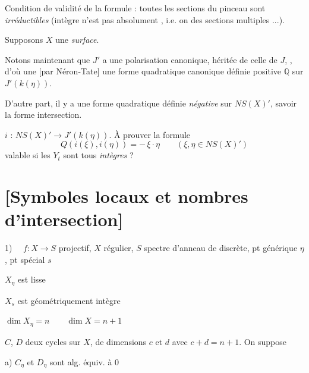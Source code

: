 \documentclass[11pt,a4paper]{article}
\begin{document}
Condition de validité de la formule : toutes les sections du pinceau sont
 \emph{irréductibles} (intègre n'est pas absolument
, i.e. on  des sections multiples ...).

Supposons $X$ une \emph{surface}.

Notons maintenant que $J'$ a une polarisation canonique, héritée de celle
de $J$, \struck{\ill{}} , d'où une
  [par Néron-Tate] une
forme quadratique canonique  définie positive $\mathbb{Q}$
sur $J'(k(\eta))$.

D'autre part, il y a  une forme quadratique définie
\emph{négative} sur $NS(X)'$, savoir la forme intersection.

$i$ \struck{\ill{}} : $NS(X)' \longrightarrow J'(k(\eta))$. À prouver la
formule
\[
  \boxed{Q(i(\xi), i(\eta)) = -\, \xi \cdot \eta} \qquad (\xi, \eta \in NS(X)')
\]
valable si les $Y_t$ sont tous \emph{intègres} ?

\section{[Symboles locaux et nombres d'intersection]}

1) $\quad f : X \to S$ projectif, $X$ régulier, $S$ spectre d'anneau de
 discrète, pt générique $\eta$, pt spécial $s$

$X_\eta$ est lisse

$X_s$ est géométriquement intègre \struck{\ill{}}

 $\dim X_\eta = n \qquad \dim X = n + 1$

$C$, $D$ deux cycles sur $X$, de dimensions $c$ et $d$ avec
$c + d = n + 1$. On suppose

a) \struck{\ill{}} $C_\eta$ et $D_\eta$ sont alg. équiv. à 0

\end{document}
